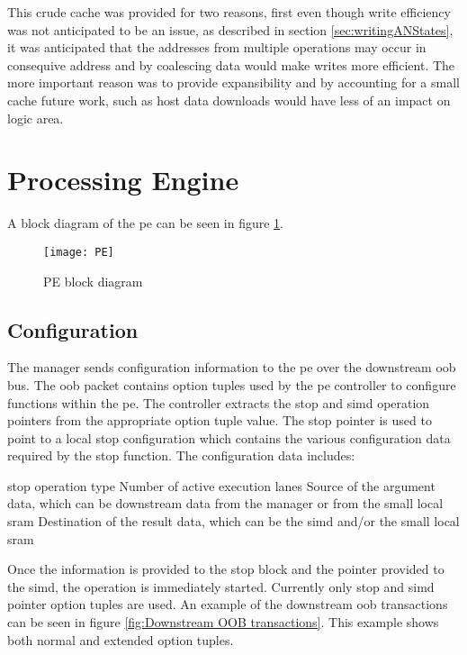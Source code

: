 This crude cache was provided for two reasons, first even though write efficiency was not anticipated to be an issue, as described in section \ref{sec:writingANStates}, it was anticipated that the addresses from multiple operations may occur in consequive address and by coalescing data would make writes more efficient.
The more important reason was to provide expansibility and by accounting for a small cache future work, such as host data downloads would have less of an impact on logic area.


\section{Processing Engine}
\label{sec:pe}

A block diagram of the \ac{pe} can be seen in figure \ref{fig:PE block diagram}.
\begin{figure}[h]
\centering
\captionsetup{justification=centering}
\captionsetup{width=.9\linewidth}
\centerline{
\mbox{\texttt{[image: PE]}}
}
\center\caption{PE block diagram}
\label{fig:PE block diagram}
\end{figure}

\subsection{Configuration}
\label{sec:peConfiguration}

The manager sends configuration information to the \ac{pe} over the downstream \ac{oob} bus.
The \ac{oob} packet contains option tuples used by the \ac{pe} controller to configure functions within the \ac{pe}.
The controller extracts the \ac{stop} and \ac{simd} operation pointers from the appropriate option tuple value.
The \ac{stop} pointer is used to point to a local \ac{stop} configuration which contains the various configuration data required by the \ac{stop} function.
The configuration data includes:
\begin{outline}
    \1 \ac{stop} operation type
    \1 Number of active execution lanes
    \1 Source of the argument data, which can be downstream data from the manager or from the small local \ac{sram}
    \1 Destination of the result data, which can be the \ac{simd} and/or the small local \ac{sram}
\end{outline}
Once the information is provided to the \ac{stop} block and the pointer provided to the \ac{simd}, the operation is immediately started.
Currently only \ac{stop} and \ac{simd} pointer option tuples are used.
An example of the downstream \ac{oob} transactions can be seen in figure \ref{fig:Downstream OOB transactions}. This example shows both normal and extended option tuples.

